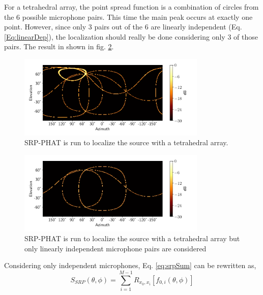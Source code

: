 For a tetrahedral array, the point spread function is a combination of circles from the 6 possible microphone pairs. This time the main peak occurs at exactly one point. However, since only 3 pairs out of the 6 are linearly independent (Eq. \ref{Eq:linearDep}), the localization should really be done considering only 3 of those pairs. The result in shown in fig. \ref{fig:4mic1srcInd}.
\begin{figure}[h]
    \centering
    \includegraphics[width=0.8\textwidth]{Figures/4mic1srcRes.png}
    \caption{SRP-PHAT is run to localize the source with a tetrahedral array.}
    \label{fig:4mic1src}
\end{figure}
\begin{figure}[h]
    \centering
    \includegraphics[width=0.8\textwidth]{Figures/Ind4mic1srcRes.png}
    \caption{SRP-PHAT is run to localize the source with a tetrahedral array but only linearly independent microphone pairs are considered}
    \label{fig:4mic1srcInd}
\end{figure}
Considering only independent microphones, Eq. \ref{eq:srpSum} can be rewritten as, 
\begin{equation}
    S_{SRP}(\theta,\phi)=\sum\limits_{i=1}^{M-1}{R_{x_0,x_i}[f_{0,i}(\theta,\phi)]}
     \label{eq:srpSumInd}
\end{equation}

